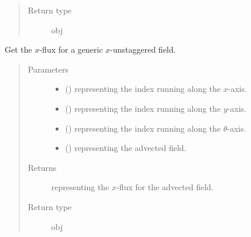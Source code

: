 \documentclass[letterpaper,10pt,english]{sphinxmanual}
\begin{document}
\begin{fulllineitems}
\begin{fulllineitems}
\begin{quote}
\begin{description}
\item[{Return type}] \leavevmode
obj

\end{description}\end{quote}

\end{fulllineitems}


\begin{fulllineitems}
\label{\detokenize{api:dycore.flux_isentropic_nonconservative_centered.FluxIsentropicNonconservativeCentered._get_centered_flux_x_unstg}}
Get the \(x\)-flux for a generic \(x\)-unstaggered field.
\begin{quote}\begin{description}
\item[{Parameters}] \leavevmode\begin{itemize}
\item {} 
 () \textendash{}  representing the index running along the \(x\)-axis.

\item {} 
 () \textendash{}  representing the index running along the \(y\)-axis.

\item {} 
 () \textendash{}  representing the index running along the \(\theta\)-axis.

\item {} 
 () \textendash{}  representing the advected field.

\end{itemize}

\item[{Returns}] \leavevmode
{} representing the \(x\)-flux for the advected field.

\item[{Return type}] \leavevmode
obj

\end{description}\end{quote}


\end{fulllineitems}
\end{fulllineitems}
\end{document}
